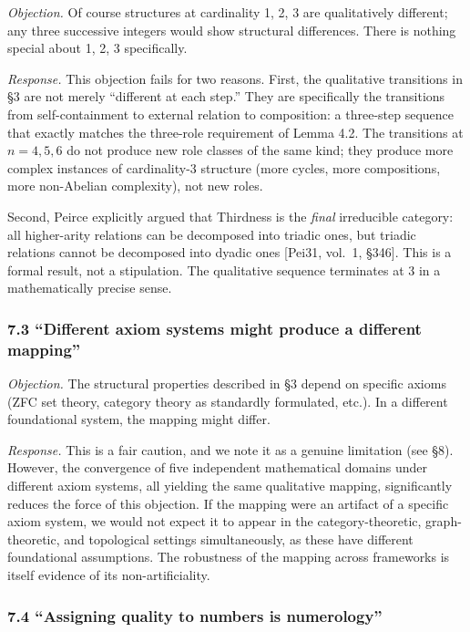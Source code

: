 \documentclass[
  11pt,
  letterpaper,
]{article}
\begin{document}
\emph{Objection.} Of course structures at cardinality 1, 2, 3 are
qualitatively different; any three successive integers would show
structural differences. There is nothing special about 1, 2, 3
specifically.

\emph{Response.} This objection fails for two reasons. First, the
qualitative transitions in §3 are not merely ``different at each step.''
They are specifically the transitions from self-containment to external
relation to composition: a three-step sequence that exactly matches the
three-role requirement of Lemma 4.2. The transitions at \(n = 4, 5, 6\)
do not produce new role classes of the same kind; they produce more
complex instances of cardinality-3 structure (more cycles, more
compositions, more non-Abelian complexity), not new roles.

Second, Peirce explicitly argued that Thirdness is the \emph{final}
irreducible category: all higher-arity relations can be decomposed into
triadic ones, but triadic relations cannot be decomposed into dyadic
ones {[}Pei31, vol.~1, §346{]}. This is a formal result, not a
stipulation. The qualitative sequence terminates at 3 in a
mathematically precise sense.

\subsubsection{7.3 ``Different axiom systems might produce a different
mapping''}\label{different-axiom-systems-might-produce-a-different-mapping}

\emph{Objection.} The structural properties described in §3 depend on
specific axioms (ZFC set theory, category theory as standardly
formulated, etc.). In a different foundational system, the mapping might
differ.

\emph{Response.} This is a fair caution, and we note it as a genuine
limitation (see §8). However, the convergence of five independent
mathematical domains under different axiom systems, all yielding the
same qualitative mapping, significantly reduces the force of this
objection. If the mapping were an artifact of a specific axiom system,
we would not expect it to appear in the category-theoretic,
graph-theoretic, and topological settings simultaneously, as these have
different foundational assumptions. The robustness of the mapping across
frameworks is itself evidence of its non-artificiality.

\subsubsection{7.4 ``Assigning quality to numbers is
numerology''}\label{assigning-quality-to-numbers-is-numerology}
\end{document}

